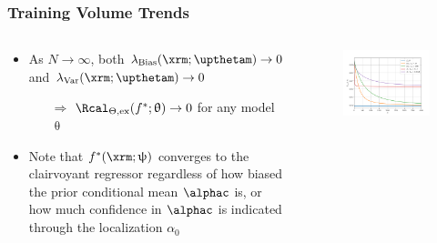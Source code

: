\documentclass[aspectratio=169]{beamer}
\begin{document}
\begin{frame}
\frametitle{Training Volume Trends}

\begin{columns}[c]

\begin{column}{.5\linewidth}

\begin{itemize}
\item As $N \to \infty$, both $\lambda_{\text{Bias}}(\xrm; \upthetam) \to 0$ and $\lambda_{\text{Var}}(\xrm; \upthetam) \to 0$
\begin{itemize}
\item[$\Rightarrow$] $\Rcal_{\Theta, \mathrm{ex}}(f^* ; \uptheta) \to 0$ for \alert{any} model $\uptheta$ 
\end{itemize} 
\vspace{.5em}
\item Note that $f^*(\xrm;\uppsi)$ converges to the clairvoyant regressor \alert{regardless} of how biased the prior conditional mean $\alphac$ is, or how much confidence in $\alphac$ is indicated through the localization $\alpha_0$
\end{itemize}


\end{column}

\begin{column}{.5\linewidth}

\begin{figure}
	\centering
	\includegraphics[width=1\linewidth]{Discrete/SE/risk_N_leg_a0.png}
	\label{fig:Discrete/SE/risk_N_leg_a0}
\end{figure}

\end{column}

\end{columns}

\end{frame}
\end{document}
